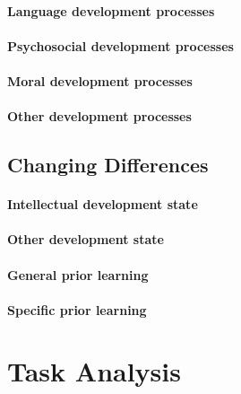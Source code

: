 \documentclass[11pt,twoside]{report} %
\begin{document}
\paragraph{Language development processes}

\paragraph{Psychosocial development processes}

\paragraph{Moral development processes}

\paragraph{Other development processes}


\subsection{Changing Differences}

\paragraph{Intellectual development state}

\paragraph{Other development state}

\paragraph{General prior learning}

\paragraph{Specific prior learning}


\section{Task Analysis}
\end{document}
